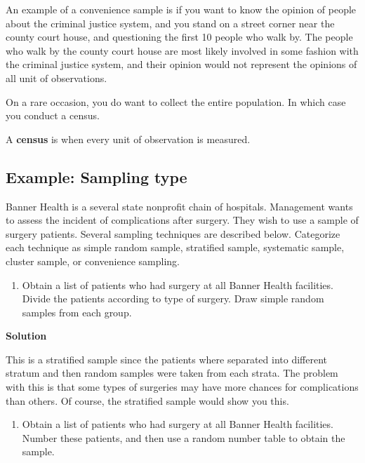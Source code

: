 \documentclass[]{book}
\providecommand{\tightlist}{%
  \setlength{\itemsep}{0pt}\setlength{\parskip}{0pt}}
\begin{document}
An example of a convenience sample is if you want to know the opinion of people about the criminal justice system, and you stand on a street corner near the county court house, and questioning the first 10 people who walk by. The people who walk by the county court house are most likely involved in some fashion with the criminal justice system, and their opinion would not represent the opinions of all unit of observations.

On a rare occasion, you do want to collect the entire population. In which case you conduct a census.

A \textbf{census} is when every unit of observation is measured.

\hypertarget{example-sampling-type}{%
\subsection{Example: Sampling type}\label{example-sampling-type}}

Banner Health is a several state nonprofit chain of hospitals. Management wants to assess the incident of complications after surgery. They wish to use a sample of surgery patients. Several sampling techniques are described below. Categorize each technique as simple random sample, stratified sample, systematic sample, cluster sample, or convenience sampling.

\begin{enumerate}
\def\labelenumi{\alph{enumi}.}
\tightlist
\item
  Obtain a list of patients who had surgery at all Banner Health
  facilities. Divide the patients according to type of surgery. Draw
  simple random samples from each group.
\end{enumerate}

\textbf{Solution}

This is a stratified sample since the patients where separated into
different stratum and then random samples were taken from each
strata. The problem with this is that some types of surgeries may
have more chances for complications than others. Of course, the
stratified sample would show you this.

\begin{enumerate}
\def\labelenumi{\alph{enumi}.}
\setcounter{enumi}{1}
\tightlist
\item
  Obtain a list of patients who had surgery at all Banner Health
  facilities. Number these patients, and then use a random number
  table to obtain the sample.
\end{enumerate}
\end{document}
